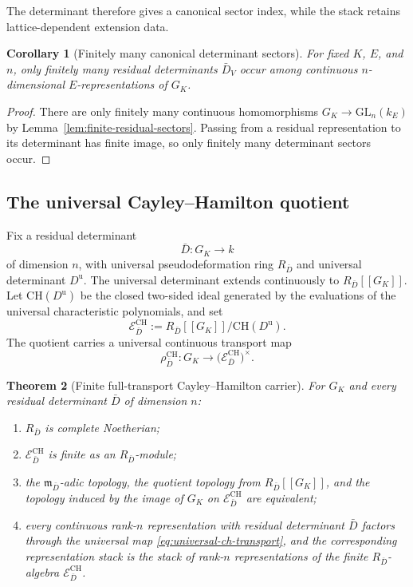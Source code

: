\documentclass[11pt]{article}
\newtheorem{theorem}{Theorem}[section]
\newtheorem{corollary}[theorem]{Corollary}
\theoremstyle{definition}
\begin{document}
The determinant therefore gives a canonical sector index, while the stack retains lattice-dependent extension data.

\begin{corollary}[Finitely many canonical determinant sectors]\label{cor:finite-determinant-sectors}
For fixed $K$, $E$, and $n$, only finitely many residual determinants $\bar D_V$ occur among continuous $n$-dimensional $E$-representations of $G_K$.
\end{corollary}

\begin{proof}
There are only finitely many continuous homomorphisms $G_K\to\mathrm{GL}_n(k_E)$ by Lemma~\ref{lem:finite-residual-sectors}.  Passing from a residual representation to its determinant has finite image, so only finitely many determinant sectors occur.
\end{proof}

\subsection{The universal Cayley--Hamilton quotient}

Fix a residual determinant
\[
\bar D:G_K\longrightarrow k
\]
of dimension $n$, with universal pseudodeformation ring $R_{\bar D}$ and universal determinant $D^{\mathrm u}$.  The universal determinant extends continuously to $R_{\bar D}[[G_K]]$.  Let $\mathrm{CH}(D^{\mathrm u})$ be the closed two-sided ideal generated by the evaluations of the universal characteristic polynomials, and set
\begin{equation}\label{eq:universal-ch-algebra}
\mathcal E^{\mathrm{CH}}_{\bar D}
:=R_{\bar D}[[G_K]]/\mathrm{CH}(D^{\mathrm u}).
\end{equation}
The quotient carries a universal continuous transport map
\begin{equation}\label{eq:universal-ch-transport}
\rho^{\mathrm{CH}}_{\bar D}:G_K
\longrightarrow
\bigl(\mathcal E^{\mathrm{CH}}_{\bar D}\bigr)^\times.
\end{equation}

\begin{theorem}[Finite full-transport Cayley--Hamilton carrier]\label{thm:ch-full-transport}
For $G_K$ and every residual determinant $\bar D$ of dimension $n$:
\begin{enumerate}
\item $R_{\bar D}$ is complete Noetherian;
\item $\mathcal E^{\mathrm{CH}}_{\bar D}$ is finite as an $R_{\bar D}$-module;
\item the $\mathfrak m_{\bar D}$-adic topology, the quotient topology from $R_{\bar D}[[G_K]]$, and the topology induced by the image of $G_K$ on $\mathcal E^{\mathrm{CH}}_{\bar D}$ are equivalent;
\item every continuous rank-$n$ representation with residual determinant $\bar D$ factors through the universal map \eqref{eq:universal-ch-transport}, and the corresponding representation stack is the stack of rank-$n$ representations of the finite $R_{\bar D}$-algebra $\mathcal E^{\mathrm{CH}}_{\bar D}$.
\end{enumerate}
\end{theorem}
\end{document}
